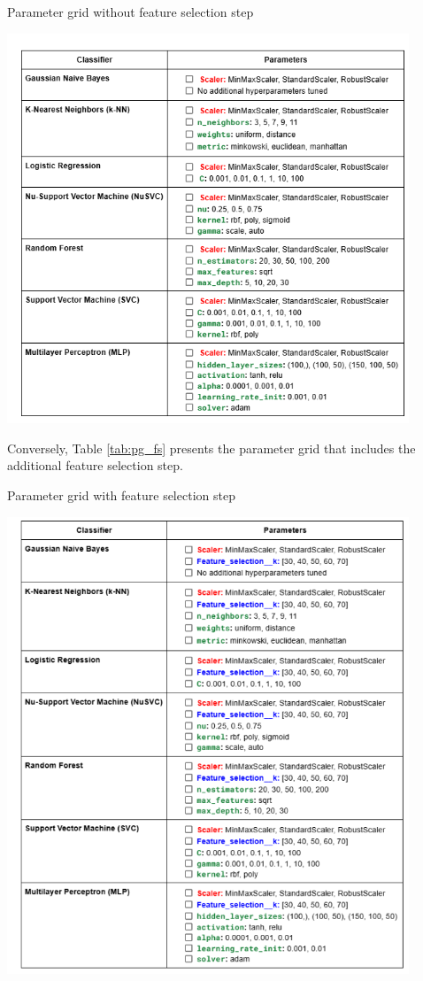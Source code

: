 \documentclass[12pt]{report}
\begin{document}
\begin{table}[ht]
    \centering
    \caption{Parameter grid without feature selection step}
    \includegraphics[width=0.9\textwidth]{Images/Results/param_grid_nofs.png}
    \label{tab:pg_nofs}
\end{table}

Conversely, Table \ref{tab:pg_fs} presents the parameter grid that includes the additional feature selection step.

\begin{table}[ht]
    \centering
    \caption{Parameter grid with feature selection step}
    \includegraphics[width=0.9\textwidth]{Images/Results/fs.png}
    \label{tab:pg_fs}
\end{table}
\end{document}
